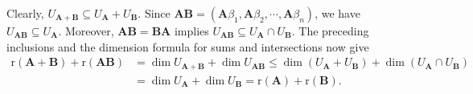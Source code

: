 \documentclass[12pt, a4paper, oneside]{book}
\begin{document}
\begin{question}
    Clearly, $U_{\mathbf{A}+\mathbf{B}} \subseteq U_{\mathbf{A}}+U_{\mathbf{B}}$. Since ${\mathbf{A} \mathbf{B}}=\left(\mathbf{A} {\beta}_1, \mathbf{A} {\beta}_2, \cdots, \mathbf{A} {\beta}_n\right)$, we have $U_{\mathbf{A} \mathbf{B}} \subseteq U_{\mathbf{A}}$. Moreover, ${\mathbf{A} \mathbf{B}}=\mathbf{B} \mathbf{A}$ implies $U_{\mathbf{A} \mathbf{B}} \subseteq U_{\mathbf{A}} \cap U_{\mathbf{B}}$. The preceding inclusions and the dimension formula for sums and intersections now give
    \[
        \begin{aligned}
            \mathrm{r}(\mathbf{A}+\mathbf{B})+\mathrm{r}(\mathbf{A} \mathbf{B}) & =\operatorname{dim} U_{\mathbf{A}+\mathbf{B}}+\operatorname{dim} U_{\mathbf{A} \mathbf{B}} \leq \operatorname{dim}\left(U_{\mathbf{A}}+U_{\mathbf{B}}\right)+\operatorname{dim}\left(U_{\mathbf{A}} \cap U_{\mathbf{B}}\right) \\
                                                                                & =\operatorname{dim} U_{\mathbf{A}}+\operatorname{dim} U_{\mathbf{B}}=\mathrm{r}(\mathbf{A})+\mathrm{r}(\mathbf{B}) .
        \end{aligned}
    \]
\end{question}
\end{document}
